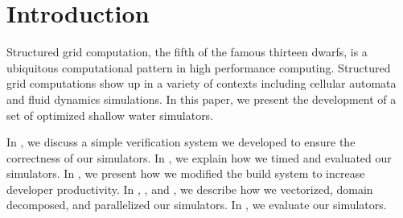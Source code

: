 \section{Introduction}\label{sec:intro}
Structured grid computation, the fifth of the famous thirteen dwarfs, is a
ubiquitous computational pattern in high performance computing. Structured grid
computations show up in a variety of contexts including cellular automata and
fluid dynamics simulations. In this paper, we present the development of a set
of optimized shallow water simulators.

In , we discuss a simple verification system we developed
to ensure the correctness of our simulators. In , we explain how
we timed and evaluated our simulators. In , we present how we
modified the build system to increase developer productivity. In
, , and , we
describe how we vectorized, domain decomposed, and parallelized our simulators.
In , we evaluate our simulators.
